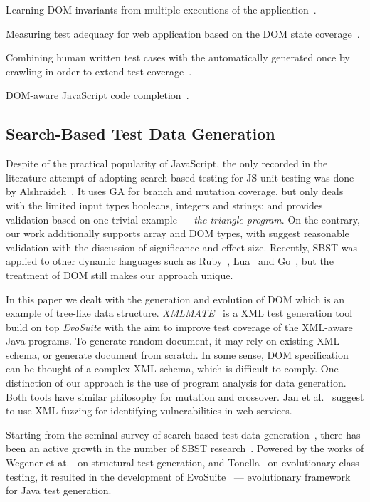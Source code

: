 \documentclass[sigconf,review,anonymous]{acmart}
\begin{document}
Learning DOM invariants from multiple executions of the application~\cite{pattabiraman2010dodom}.

Measuring test adequacy for web application based on the DOM state coverage~\cite{mirzaaghaei2014dom}.

Combining human written test cases with the automatically generated once by crawling in order to extend test coverage~\cite{milani2014leveraging}.

DOM-aware JavaScript code completion~\cite{bajaj2014dompletion}. 


\subsection{Search-Based Test Data Generation}
\label{sub.sec.search.based}

Despite of the practical popularity of JavaScript, the only recorded in the literature attempt of adopting search-based testing for JS unit testing was done by Alshraideh~\cite{alshraideh2008complete}. It uses GA for branch and mutation coverage, but only deals with the limited input types booleans, integers and strings; and provides validation based on one trivial example --- \emph{the triangle program}. On the contrary, our work additionally supports array and DOM types, with suggest reasonable validation with the discussion of significance and effect size. Recently, SBST was applied to other dynamic languages such as Ruby~\cite{mairhofer2011search}, Lua~\cite{wibowo2015unit} and Go~\cite{irawan2016test}, but the treatment of DOM still makes our approach unique.
 
In this paper we dealt with the generation and evolution of DOM which is an example of tree-like data structure. \emph{XMLMATE}~\cite{havrikov2014xmlmate} is a XML test generation tool build on top \emph{EvoSuite} with the aim to improve test coverage of the XML-aware Java programs. To generate random document, it may rely on existing XML schema, or generate document from scratch. In some sense, DOM specification can be thought of a complex XML schema, which is difficult to comply. One distinction of our approach is the use of program analysis for data generation. Both tools have similar philosophy for mutation and crossover. Jan et al.~\cite{jan2016automated} suggest to use XML fuzzing for identifying vulnerabilities in web services. 

Starting from the seminal survey of search-based test data generation~\cite{mcminn2004search}, there has been an active growth in the number of SBST research~\cite{mcminn2011search}. Powered by the works of Wegener et at.~\cite{wegener2001evolutionary} on structural test generation, and Tonella~\cite{tonella2004evolutionary} on evolutionary class testing, it resulted in the development of EvoSuite~\cite{fraser2011evosuite} --- evolutionary framework for Java test generation.
\end{document}
